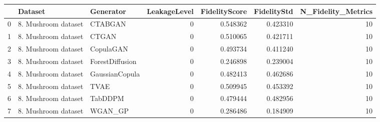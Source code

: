 \begin{tabular}{lllrrrr}
\toprule
 & Dataset & Generator & LeakageLevel & FidelityScore & FidelityStd & N_Fidelity_Metrics \\
\midrule
0 & 8. Mushroom dataset & CTABGAN & 0 & 0.548362 & 0.423310 & 10 \\
1 & 8. Mushroom dataset & CTGAN & 0 & 0.510065 & 0.421711 & 10 \\
2 & 8. Mushroom dataset & CopulaGAN & 0 & 0.493734 & 0.411240 & 10 \\
3 & 8. Mushroom dataset & ForestDiffusion & 0 & 0.246898 & 0.239004 & 10 \\
4 & 8. Mushroom dataset & GaussianCopula & 0 & 0.482413 & 0.462686 & 10 \\
5 & 8. Mushroom dataset & TVAE & 0 & 0.509945 & 0.453392 & 10 \\
6 & 8. Mushroom dataset & TabDDPM & 0 & 0.479444 & 0.482956 & 10 \\
7 & 8. Mushroom dataset & WGAN_GP & 0 & 0.286486 & 0.184909 & 10 \\
\bottomrule
\end{tabular}
